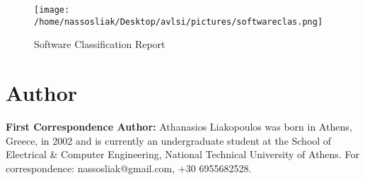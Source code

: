 \documentclass[conference]{IEEEtran}
\begin{document}
\begin{figure}[!h]
    \centering
    \texttt{[image: /home/nassosliak/Desktop/avlsi/pictures/softwareclas.png]}
    \caption{Software Classification Report}
    \label{fig:softwareclas}
\end{figure}
\section{\textbf{Author}}
\vspace{1cm}
\textbf{First Correspondence Author:}  
Athanasios Liakopoulos was born in Athens, Greece, in 2002 and is currently an undergraduate student at the School of Electrical \& Computer Engineering, National Technical University of Athens.  
For correspondence: nassosliak@gmail.com, +30 6955682528.
\end{document}
